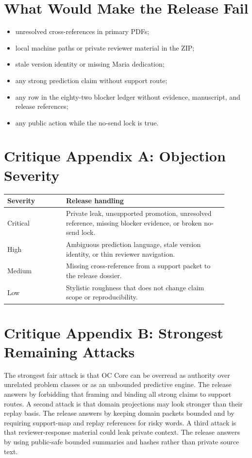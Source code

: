 \documentclass[11pt,a4paper]{article}
\begin{document}
\section*{What Would Make the Release Fail}
\begin{itemize}
  \item unresolved cross-references in primary PDFs;
  \item local machine paths or private reviewer material in the ZIP;
  \item stale version identity or missing Maria dedication;
  \item any strong prediction claim without support route;
  \item any row in the eighty-two blocker ledger without evidence, manuscript, and release references;
  \item any public action while the no-send lock is true.
\end{itemize}

\clearpage
\section*{Critique Appendix A: Objection Severity}
\begin{longtable}{>{\raggedright\arraybackslash}p{0.24\linewidth}>{\raggedright\arraybackslash}p{0.66\linewidth}}
\textbf{Severity} & \textbf{Release handling}\\
\hline
Critical & Private leak, unsupported promotion, unresolved reference, missing blocker evidence, or broken no-send lock.\\
High & Ambiguous prediction language, stale version identity, or thin reviewer navigation.\\
Medium & Missing cross-reference from a support packet to the release dossier.\\
Low & Stylistic roughness that does not change claim scope or reproducibility.\\
\end{longtable}

\clearpage
\section*{Critique Appendix B: Strongest Remaining Attacks}
The strongest fair attack is that OC Core can be overread as authority over unrelated problem classes or as an unbounded predictive engine. The release answers by forbidding that framing and binding all strong claims to support routes. A second attack is that domain projections may look stronger than their replay basis. The release answers by keeping domain packets bounded and by requiring support-map and replay references for risky words. A third attack is that reviewer-response material could leak private context. The release answers by using public-safe bounded summaries and hashes rather than private source text.
\end{document}
